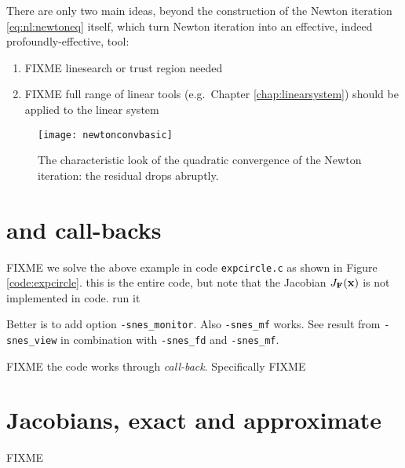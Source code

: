 There are only two main ideas, beyond the construction of the Newton iteration \eqref{eq:nl:newtoneq} itself, which turn Newton iteration into an effective, indeed profoundly-effective, tool:
\renewcommand{\labelenumi}{\roman{enumi})}
\begin{enumerate}
\item FIXME linesearch or trust region needed \citep{Kelley2003}
\item FIXME full range of linear tools (e.g.~Chapter \ref{chap:linearsystem}) should be applied to the linear system
\end{enumerate}

\begin{figure}
\texttt{[image: newtonconvbasic]}
\caption{The characteristic look of the quadratic convergence of the Newton iteration: the residual drops abruptly.}
\label{fig:newtonconvbasic}
\end{figure}



\section{\pSNES and call-backs}

FIXME  we solve the above example in code \texttt{expcircle.c} as shown in Figure \ref{code:expcircle}.  this is the entire code, but note that the Jacobian $J_{\mathbf{F}}(\mathbf{x})$ is not implemented in code.  run it
Better is to add option \texttt{-snes\_monitor}.  Also \texttt{-snes\_mf} works.  See result from \texttt{-snes\_view} in combination with \texttt{-snes\_fd} and \texttt{-snes\_mf}.

FIXME the code works through \emph{call-back}.  Specifically FIXME

\vfill
{}


\section{Jacobians, exact and approximate}

FIXME

\vfill
{}



